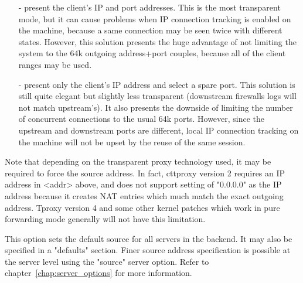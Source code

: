   \begin{itemize}
  \item[-] present the client's IP and port addresses. This is the most transparent
      mode, but it can cause problems when IP connection tracking is enabled on
      the machine, because a same connection may be seen twice with different
      states. However, this solution presents the huge advantage of not
      limiting the system to the 64k outgoing address+port couples, because all
      of the client ranges may be used.

   \item[-] present only the client's IP address and select a spare port. This
      solution is still quite elegant but slightly less transparent (downstream
      firewalls logs will not match upstream's). It also presents the downside
      of limiting the number of concurrent connections to the usual 64k ports.
      However, since the upstream and downstream ports are different, local IP
      connection tracking on the machine will not be upset by the reuse of the
      same session.
  \end{itemize}

  Note that depending on the transparent proxy technology used, it may be
  required to force the source address. In fact, cttproxy version 2 requires an
  IP address in <addr> above, and does not support setting of "0.0.0.0" as the
  IP address because it creates NAT entries which much match the exact outgoing
  address. Tproxy version 4 and some other kernel patches which work in pure
  forwarding mode generally will not have this limitation.

  This option sets the default source for all servers in the backend. It may
  also be specified in a "defaults" section. Finer source address specification
  is possible at the server level using the "source" server option. Refer to
  chapter~\ref{chap:server_options} for more information.

